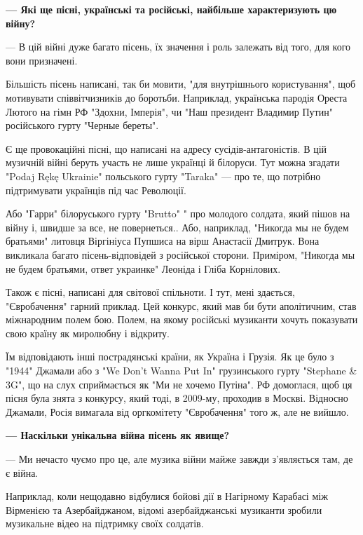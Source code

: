 {\bfseries 
— Які ще пісні, українські та російські, найбільше характеризують цю війну? 
}

— В цій війні дуже багато пісень, їх значення і роль залежать від того, для
кого вони призначені. 

Більшість пісень написані, так би мовити, "для внутрішнього користування", щоб
мотивувати співвітчизників до боротьби. Наприклад, українська пародія Ореста
Лютого на гімн РФ "Здохни, Імперія", чи "Наш президент Владимир Путин"
російського гурту "Черные береты". 

Є ще провокаційні пісні, що написані на адресу сусідів-антагоністів. В цій
музичній війні беруть участь не лише українці й білоруси. Тут можна згадати
"Podaj Rękę Ukrainie" польського гурту "Taraka" — про те, що потрібно
підтримувати українців під час Революції. 

Або "Гарри" білоруського гурту "Brutto" " про молодого солдата, який пішов на
війну і, швидше за все, не повернеться.. Або, наприклад, "Никогда мы не будем
братьями" литовця Віргініуса Пупшиса на вірш Анастасії Дмитрук. Вона викликала
багато пісень-відповідей з російської сторони. Приміром, "Никогда мы не будем
братьями, ответ украинке" Леоніда і Гліба Корнілових. 


Також є пісні, написані для світової спільноти. І тут, мені здається,
"Євробачення" гарний приклад. Цей конкурс, який мав би бути аполітичним, став
міжнародним полем бою. Полем, на якому російські музиканти хочуть показувати
свою країну як миролюбну і відкриту. 

Їм відповідають інші пострадянські країни, як Україна і Грузія. Як це було з
"1944" Джамали або з "We Don’t Wanna Put In" грузинського гурту "Stephane \&
3G", що на слух сприймається як "Ми не хочемо Путіна". РФ домоглася, щоб ця
пісня була знята з конкурсу, який тоді, в 2009-му, проходив в Москві. Відносно
Джамали, Росія вимагала від оргкомітету "Євробачення" того ж, але не вийшло.

\textbf{— Наскільки унікальна війна пісень як явище?} 

— Ми нечасто чуємо про це, але музика війни майже завжди з’являється там, де є
війна. 

Наприклад, коли нещодавно відбулися бойові дії в Нагірному Карабасі між
Вірменією та Азербайджаном, відомі азербайджанські музиканти зробили музикальне
відео на підтримку своїх солдатів. 

